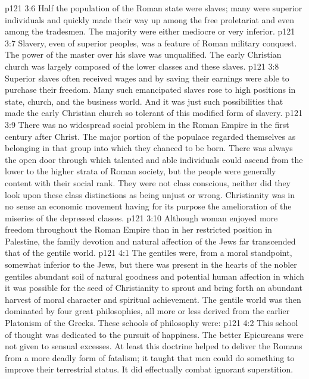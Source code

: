 \vs p121 3:6 \bibnobreakspace {} Half the population of the Roman state were slaves; many were superior individuals and quickly made their way up among the free proletariat and even among the tradesmen. The majority were either mediocre or very inferior.
\vs p121 3:7 Slavery, even of superior peoples, was a feature of Roman military conquest. The power of the master over his slave was unqualified. The early Christian church was largely composed of the lower classes and these slaves.
\vs p121 3:8 Superior slaves often received wages and by saving their earnings were able to purchase their freedom. Many such emancipated slaves rose to high positions in state, church, and the business world. And it was just such possibilities that made the early Christian church so tolerant of this modified form of slavery.
\vs p121 3:9 \pc There was no widespread social problem in the Roman Empire in the first century after Christ. The major portion of the populace regarded themselves as belonging in that group into which they chanced to be born. There was always the open door through which talented and able individuals could ascend from the lower to the higher strata of Roman society, but the people were generally content with their social rank. They were not class conscious, neither did they look upon these class distinctions as being unjust or wrong. Christianity was in no sense an economic movement having for its purpose the amelioration of the miseries of the depressed classes.
\vs p121 3:10 Although woman enjoyed more freedom throughout the Roman Empire than in her restricted position in Palestine, the family devotion and natural affection of the Jews far transcended that of the gentile world.
\vs p121 4:1 The gentiles were, from a moral standpoint, somewhat inferior to the Jews, but there was present in the hearts of the nobler gentiles abundant soil of natural goodness and potential human affection in which it was possible for the seed of Christianity to sprout and bring forth an abundant harvest of moral character and spiritual achievement. The gentile world was then dominated by four great philosophies, all more or less derived from the earlier Platonism of the Greeks. These schools of philosophy were:
\vs p121 4:2 \bibnobreakspace {} This school of thought was dedicated to the pursuit of happiness. The better Epicureans were not given to sensual excesses. At least this doctrine helped to deliver the Romans from a more deadly form of fatalism; it taught that men could do something to improve their terrestrial status. It did effectually combat ignorant superstition.
